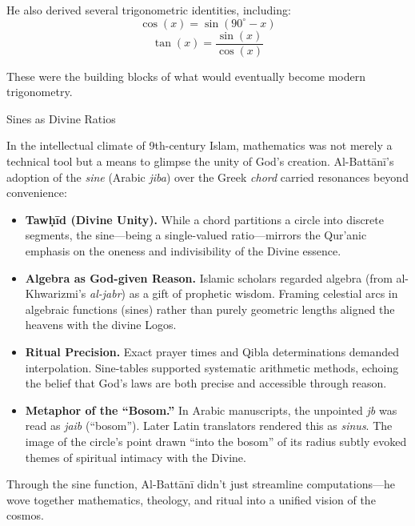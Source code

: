 He also derived several trigonometric identities, including:
\[
\cos(x) = \sin(90^\circ - x)
\]
\[
\tan(x) = \frac{\sin(x)}{\cos(x)}
\]

These were the building blocks of what would eventually become modern trigonometry.

\medskip

\begin{HistoricalSidebar}{Sines as Divine Ratios}

In the intellectual climate of 9th-century Islam, mathematics was not merely a technical tool but a means to glimpse the unity of God’s creation. Al-Battānī’s adoption of the \emph{sine} (Arabic \emph{jiba}) over the Greek \emph{chord} carried resonances beyond convenience:

\medskip

\begin{itemize}
    \item \textbf{Tawḥīd (Divine Unity).}  
    While a chord partitions a circle into discrete segments, the sine—being a single-valued ratio—mirrors the Qur’anic emphasis on the oneness and indivisibility of the Divine essence.

    \item \textbf{Algebra as God-given Reason.}  
    Islamic scholars regarded algebra (from al-Khwarizmi’s \emph{al-jabr}) as a gift of prophetic wisdom. Framing celestial arcs in algebraic functions (sines) rather than purely geometric lengths aligned the heavens with the divine Logos.

    \item \textbf{Ritual Precision.}  
    Exact prayer times and Qibla determinations demanded interpolation. Sine-tables supported systematic arithmetic methods, echoing the belief that God’s laws are both precise and accessible through reason.

    \item \textbf{Metaphor of the “Bosom.”}  
    In Arabic manuscripts, the unpointed \emph{jb} was read as \emph{jaib} (“bosom”). Later Latin translators rendered this as \emph{sinus}. The image of the circle’s point drawn “into the bosom” of its radius subtly evoked themes of spiritual intimacy with the Divine.
\end{itemize}

\medskip

Through the sine function, Al-Battānī didn’t just streamline computations—he wove together mathematics, theology, and ritual into a unified vision of the cosmos.
\end{HistoricalSidebar}


